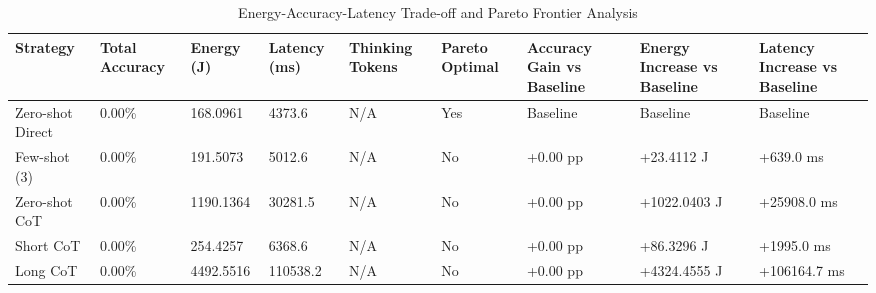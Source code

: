 \begin{table}
\caption{Energy-Accuracy-Latency Trade-off and Pareto Frontier Analysis}
\label{tab:tradeoff_comparison}
\begin{tabular}{lllllllll}
\toprule
Strategy & Total Accuracy & Energy (J) & Latency (ms) & Thinking Tokens & Pareto Optimal & Accuracy Gain vs Baseline & Energy Increase vs Baseline & Latency Increase vs Baseline \\
\midrule
Zero-shot Direct & 0.00\% & 168.0961 & 4373.6 & N/A & Yes & Baseline & Baseline & Baseline \\
Few-shot (3) & 0.00\% & 191.5073 & 5012.6 & N/A & No & +0.00 pp & +23.4112 J & +639.0 ms \\
Zero-shot CoT & 0.00\% & 1190.1364 & 30281.5 & N/A & No & +0.00 pp & +1022.0403 J & +25908.0 ms \\
Short CoT & 0.00\% & 254.4257 & 6368.6 & N/A & No & +0.00 pp & +86.3296 J & +1995.0 ms \\
Long CoT & 0.00\% & 4492.5516 & 110538.2 & N/A & No & +0.00 pp & +4324.4555 J & +106164.7 ms \\
\bottomrule
\end{tabular}
\end{table}
